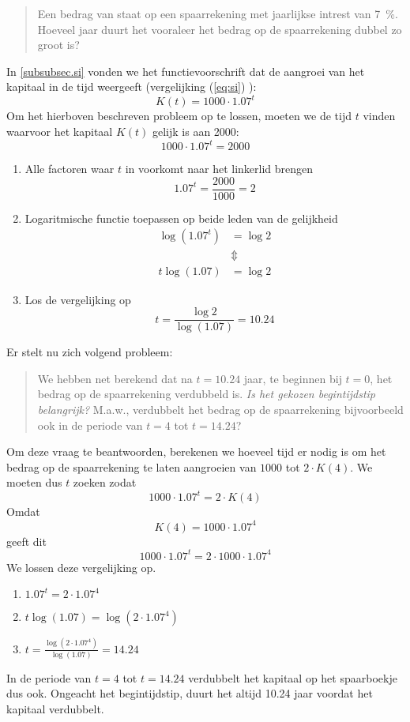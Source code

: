   \begin{quote}
 Een bedrag van  staat op een spaarrekening met jaarlijkse intrest van \SI{7}{\percent}. Hoeveel jaar duurt het vooraleer het bedrag op de spaarrekening dubbel zo groot is?
\end{quote}
In \ref{subsubsec.si} vonden we het functievoorschrift dat de aangroei van het
kapitaal in de tijd weergeeft (vergelijking  (\ref{eq:si}) ):
 \begin{displaymath}
     K(t)=1000\cdot \num{1.07}^{t}
 \end{displaymath}
Om het hierboven beschreven probleem op te lossen, moeten we de tijd $t$ vinden waarvoor het kapitaal $K(t)$ gelijk is  aan 2000:
\[
1000\cdot \num{1.07}^{t}  =  2000 
\]
\begin{enumerate}
\item Alle factoren waar $t$ in voorkomt naar het linkerlid brengen
\[
\num{1.07}^{t}=\frac{2000}{1000}=2
\]
\addtocounter{enumi}{1}
\item Logaritmische functie toepassen op beide leden van de gelijkheid
\[
\begin{split}
\log \left(\num{1.07}^{t} \right)&=\log 2\\
&\Updownarrow \\
t\log \left(\num{1.07} \right)&=\log 2
\end{split}
\]
\item Los de vergelijking op
\[
t=\frac{\log 2}{\log \left(\num{1.07} \right)}=\num{10.24}
\]
\end{enumerate}

Er stelt nu zich volgend probleem:
 \begin{quote}
 We hebben net berekend dat na $t=\num{10.24}$ jaar, te beginnen bij $t=0$,  het bedrag op de spaarrekening verdubbeld is.\emph{ Is het gekozen begintijdstip belangrijk?} M.a.w., verdubbelt het bedrag op de spaarrekening bijvoorbeeld ook in de periode van $t=4$ tot $t=\num{14.24}$?
 \end{quote}
 Om deze vraag te beantwoorden, berekenen we hoeveel tijd er nodig is om het bedrag op de spaarrekening te laten aangroeien van $1000$ tot $2\cdot K(4)$. We moeten dus $t$ zoeken zodat 
 \[
1000\cdot \num{1.07}^t= 2\cdot K(4)
 \]
 Omdat 
 \[
 K(4)=1000\cdot \num{1.07}^4
 \]
 geeft dit
 \[
 1000\cdot \num{1.07}^t=2\cdot 1000\cdot \num{1.07}^4
 \]
 We lossen deze vergelijking op.
 \begin{enumerate}
 \item $\displaystyle 
     \num{1.07}^{t} =  2 \cdot \num{1.07}^{4} $
 \addtocounter{enumi}{1}
 \item $\displaystyle 
     t\log(\num{1.07}) =  \log\left(2\cdot \num{1.07}^{4}\right) $
 \item $\displaystyle 
     t =  \frac{\log\left(2\cdot \num{1.07}^{4}\right)}{\log(\num{1.07})}=\num{14.24}$
 \end{enumerate}
 In de periode van $t=4$ tot $t=\num{14.24}$ verdubbelt het kapitaal op het spaarboekje dus ook. Ongeacht het begintijdstip, duurt het altijd \num{10.24} jaar voordat het kapitaal verdubbelt.
 
